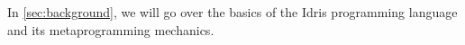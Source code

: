 

In \autoref{sec:background}, we will go over the basics of the Idris
programming language and its metaprogramming mechanics.


